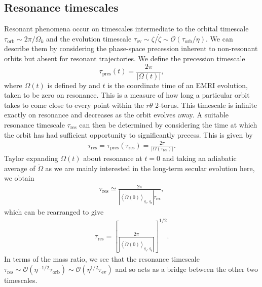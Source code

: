 \subsection{Resonance timescales}
\label{sec:res-timescales}
Resonant phenomena occur on timescales intermediate to the orbital timescale $\tau_\mathrm{orb} \sim 2\pi/\Omega_k$ and the evolution timescale $\tau_\mathrm{ev} \sim \zeta/\dot{\zeta} \sim \mathcal{O}(\tau_\mathrm{orb}/\eta)$. We can describe them by considering the phase-space precession inherent to non-resonant orbits but absent for resonant trajectories. We define the precession timescale
\begin{equation}
\tau_\mathrm{pres}(t) = \frac{2\pi}{|\Omega(t)|},
\end{equation}
where $\Omega(t)$ is defined by  and $t$ is the coordinate time of an EMRI evolution, taken to be zero on resonance. This is a measure of how long a particular orbit takes to come close to every point within the $r\theta$ 2-torus. This timescale is infinite exactly on resonance and decreases as the orbit evolves away. A suitable resonance timescale $\tau_\mathrm{res}$ can then be determined by considering the time at which the orbit has had sufficient opportunity to significantly precess. This is given by
\begin{align}
\tau_\mathrm{res} = \tau_\mathrm{pres}(\tau_\mathrm{res}) = \frac{2\pi}{|\Omega(\tau_\mathrm{res})|}.
\end{align}
Taylor expanding $\Omega(t)$ about resonance at $t=0$ and taking an adiabatic average of $\dot{\Omega}$ as we are mainly interested in the long-term secular evolution here, we obtain
\begin{align}
\tau_\mathrm{res} \simeq \frac{2\pi}{\left|\left\langle\dot{\Omega}(0)\right\rangle_{q_r,\,q_\theta}\right| \tau_\mathrm{res}},
\end{align}
which can be rearranged to give
\begin{align}
\label{eq:res-timescale}
\tau_\mathrm{res} = \left[ \frac{2\pi}{\left|\left\langle\dot{\Omega}(0)\right\rangle_{q_r,\,q_\theta}\right|} \right]^{1/2}.
\end{align}
In terms of the mass ratio, we see that the resonance timescale $\tau_\mathrm{res} \sim \mathcal{O}(\eta^{-1/2}\tau_\mathrm{orb}) \sim \mathcal{O}(\eta^{1/2}\tau_\mathrm{ev})$ and so acts as a bridge between the other two timescales.

